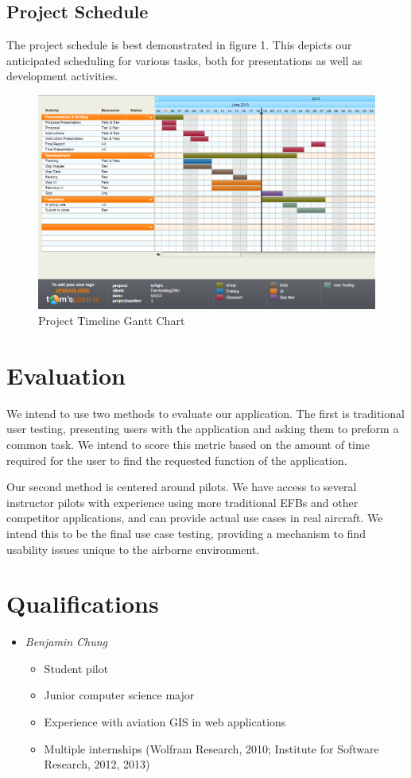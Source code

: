\documentclass[10pt,a4paper]{article}
\begin{document}
\subsection{Project Schedule}
The project schedule is best demonstrated in figure 1. This depicts our anticipated scheduling for various tasks, both for presentations as well as development activities.
\begin{figure}[h]
\includegraphics[scale=.4]{gantt}
\caption{Project Timeline Gantt Chart}
\end{figure}
\section{Evaluation}
We intend to use two methods to evaluate our application. The first is traditional user testing, presenting users with the application and asking them to preform a common task. We intend to score this metric based on the amount of time required for the user to find the requested function of the application.

Our second method is centered around pilots. We have access to several instructor pilots with experience using more traditional EFBs and other competitor applications, and can provide actual use cases in real aircraft. We intend this to be the final use case testing, providing a mechanism to find usability issues unique to the airborne environment.

\section{Qualifications}
\begin{itemize}
\item \emph{Benjamin Chung} 
\begin{itemize}
\item Student pilot
\item Junior computer science major
\item Experience with aviation GIS in web applications
\item Multiple internships (Wolfram Research, 2010; Institute for Software Research, 2012, 2013)
\end{itemize}
\end{itemize}
\end{document}
